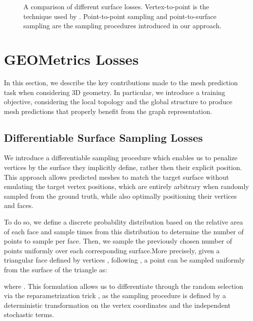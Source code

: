 \documentclass{article}
\begin{document}
\begin{figure}[t!]
\caption{A comparison of different surface losses. Vertex-to-point is the technique used by \citet{Pixel2Mesh}. Point-to-point sampling and point-to-surface sampling are the sampling procedures introduced in our approach.}
\label{fig:LossComparison}
\end{figure}

\section{GEOMetrics Losses}

In this section, we describe the key contributions made to the mesh prediction task when considering 3D geometry. In particular, we introduce a training objective, considering the local topology and the global structure to produce mesh predictions that properly benefit from the graph representation. 


\subsection{Differentiable Surface Sampling Losses}

We introduce a differentiable sampling procedure which enables us to penalize vertices by the surface they implicitly define, rather then their explicit position. This approach allows predicted meshes to match the target surface without emulating the target vertex positions, which are entirely arbitrary when randomly sampled from the ground truth, while also optimally positioning their vertices and faces. 

To do so, we define a discrete probability distribution based on the relative area of each face and sample  times from this distribution to determine the number of points to sample per face. Then, we sample the previously chosen number of points uniformly over each corresponding surface.More precisely, given a triangular face defined by vertices , following \citet{osada2002shape}, a point  can be sampled uniformly from the surface of the triangle as:

where . This formulation allows us to differentiate through the random selection via the reparametrization trick \cite{kingma2013auto, rezende2014stochastic}, as the sampling procedure is defined by a deterministic transformation on the vertex coordinates and the independent stochastic terms.
\end{document}
